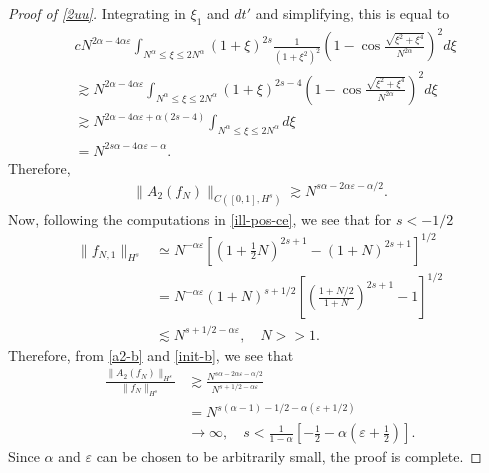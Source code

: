 \documentclass[12pt,reqno]{amsart}
\numberwithin{equation}{section}  %
\newcommand{\ee}{\varepsilon}
\begin{document}
\begin{proof}[Proof of \ref{2uu}]
%
%
Integrating in $\xi_{1}$ and $dt'$ and simplifying, this is equal to
%
%
%
%
\begin{equation*}
\begin{split}
  & c N^{2 \alpha - 4 \alpha \ee} \int_{N^{\alpha} \le \xi \le 2N^{\alpha}}
  (1 + \xi)^{2s} \frac{1}{(1 + \xi^{2})^{2}}
  \left ( 1 - \cos \frac{\sqrt{\xi^{2} + \xi^{4}}}{N^{2 \alpha}} \right )^{2} d \xi
  \\
  & \gtrsim N^{2 \alpha - 4 \alpha \ee} \int_{N^{\alpha} \le \xi \le 2N^{\alpha}}
  (1 + \xi)^{2s -4} 
\left ( 1 - \cos \frac{\sqrt{\xi^{2} + \xi^{4}}}{N^{2 \alpha}} \right )^{2} d \xi
    \\
    & \gtrsim N^{2\alpha - 4 \alpha \ee + \alpha(2s -4) } \int_{N^{\alpha} \le
    \xi \le 2 N^{\alpha}} d \xi
  \\
  & = N^{2s \alpha - 4 \alpha \ee - \alpha}.
\end{split}
\end{equation*}
%
%
Therefore,
%
%
%
\begin{equation}
  \label{a2-b}
\begin{split}
  \| A_{2}(f_{N}) \|_{C([0, 1], H^{s})} \gtrsim N^{s \alpha - 2 \alpha \ee -
  \alpha/2}.  
\end{split}
\end{equation}
%
%
%
Now, following the computations in \eqref{ill-pos-ce}, we see that for $s <
-1/2$
%
%
\begin{equation}
  \label{init-b}
\begin{split}
  \| f_{N,1} \|_{H^{s}} & \simeq N^{-\alpha \ee}\left[ (1 +
  \frac{1}{2}N)^{2 s +1} - (1 + N)^{2 s +1} \right]^{1/2}
  \\
  & = N^{-\alpha \ee}(1 + N)^{s + 1/2} \left[ \left( \frac{1 + N/2}{1 +
  N} \right)^{2 s +1} -1 \right]^{1/2}
  \\
  & \lesssim N^{s + 1/2 -\alpha \ee}, \quad N > > 1. 
\end{split}
\end{equation}
%
%
Therefore, from \eqref{a2-b} and \eqref{init-b}, we see that
%
%
\begin{equation*}
\begin{split}
  \frac{\| A_{2}(f_{N}) \|_{H^{s}}}{\| f_{N} \|_{H^{s}}}
  & \gtrsim \frac{N^{s \alpha - 2 \alpha \ee - \alpha/2}}{N^{s + 1/2 - \alpha \ee}}
  \\
  & = N^{s( \alpha -1) -1/2 - \alpha(\ee +1/2)} 
  \\
  & \to \infty, \quad s <
  \frac{1}{1 - \alpha}\left[ -\frac{1}{2} - \alpha(\ee + \frac{1}{2}) \right].
\end{split}
\end{equation*}
%
%
Since $\alpha$ and $\ee$ can be chosen to be arbitrarily small, the proof is
complete. 
%
%
%
%
%
\end{proof}
\end{document}
